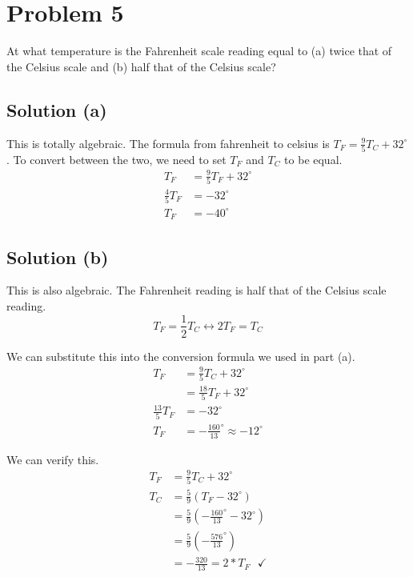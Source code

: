 \documentclass[12pt]{article}
\begin{document}
    \section{Problem 5}
        At what temperature is the Fahrenheit scale reading equal to (a) twice that of the Celsius scale and (b) half that of the Celsius scale?

        \subsection{Solution (a)}
            This is totally algebraic. 
            The formula from fahrenheit to celsius is $T_F = \frac{9}{5}T_C + 32^{\circ}$.
            To convert between the two, we need to set $T_F$ and $T_C$ to be equal.
            \begin{align}
                T_F &=  \frac{9}{5}T_F + 32^\circ\\
                \frac{4}{5}T_F  &=  -32^\circ\\
                T_F &=  \boxed{-40^\circ}
            \end{align}

        \subsection{Solution (b)}
            This is also algebraic.
            The Fahrenheit reading is half that of the Celsius scale reading.
            \begin{equation}
                T_F = \frac{1}{2}T_C \leftrightarrow 2 T_F = T_C
            \end{equation}

            We can substitute this into the conversion formula we used in part (a).
            \begin{align}
                T_F &=  \frac{9}{5}T_C + 32^\circ\\
                    &=  \frac{18}{5}T_F + 32^\circ\\
                \frac{13}{5}T_F &=  -32^\circ\\
                T_F &=  \boxed{-\frac{160}{13}^\circ \approx -12^\circ}
            \end{align}

            We can verify this.
            \begin{align}
                T_F &=  \frac{9}{5}T_C + 32^\circ\\
                T_C &=  \frac{5}{9}\left(T_F - 32^\circ\right)\\
                    &=  \frac{5}{9}\left(-\frac{160}{13}^\circ - 32^\circ\right)\\
                    &=  \frac{5}{9}\left(-\frac{576}{13}^\circ\right)\\
                    &=  -\frac{320}{13} = 2 * T_F\ \ \ \checkmark
            \end{align}
\end{document}
